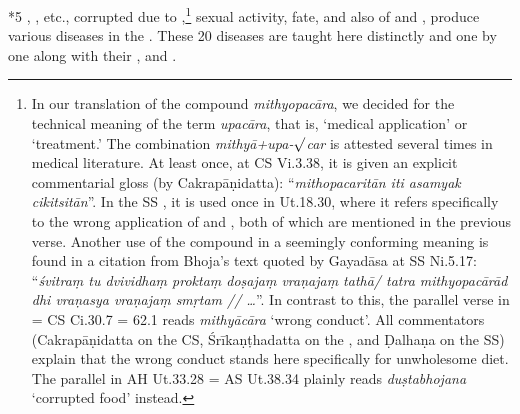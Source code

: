 \begin{translation}
    
    \item [*5] , , etc., corrupted due to
,\footnote{In our translation of
    the compound \emph{mithyopacāra}, we decided for the technical meaning of the
    term \emph{upacāra}, that is, `medical application' or `treatment.' The
    combination \emph{mithyā+upa-$\surd$car} is attested several times in
    medical literature. At least once, at CS Vi.3.38, it is given an explicit
    commentarial gloss (by Cakrapāṇidatta): ``\emph{mithopacaritān iti asamyak
        cikitsitān}''. In the SS \parencite{vulgate}, it is used once in Ut.18.30,
    where it refers specifically to the wrong application of
     and , both of which are
    mentioned in the previous verse. Another use of the compound in a seemingly
    conforming meaning is found in a citation from Bhoja's text quoted by Gayadāsa
    at SS Ni.5.17: ``\emph{śvitraṃ tu dvividhaṃ proktaṃ doṣajaṃ vraṇajaṃ tathā/
        tatra mithyopacārād dhi vraṇasya vraṇajaṃ smṛtam // \ldots}''. In contrast to
    this, the parallel verse in \cite{vulgate} = CS Ci.30.7 = \cite{madhava} 62.1
    reads \emph{mithyācāra} ‘wrong conduct’. All commentators (Cakrapāṇidatta on
    the CS, Śrīkaṇṭhadatta on the \cite{madhava}, and Ḍalhaṇa on the SS) explain
    that the wrong conduct stands here specifically for unwholesome diet. The
    parallel in AH Ut.33.28 = AS Ut.38.34 plainly reads \emph{duṣtabhojana}
    `corrupted food' instead.} sexual activity, fate, and also 
of  and , produce various diseases
in the . These 20 diseases are taught here
distinctly and one by one along with their ,
 and . %
\end{translation}

